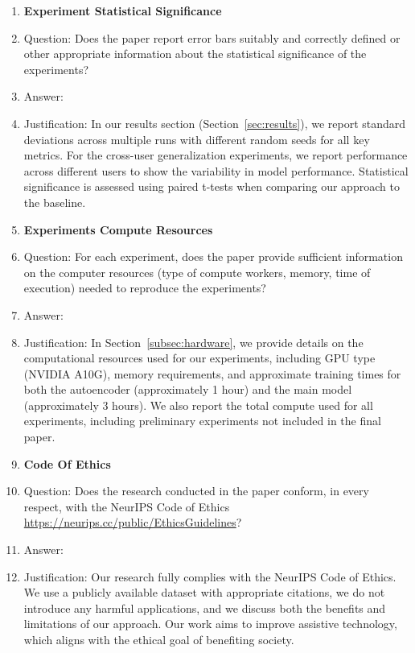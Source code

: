 \begin{enumerate}
    \item {\bf Experiment Statistical Significance}
    \item[] Question: Does the paper report error bars suitably and correctly defined or other appropriate information about the statistical significance of the experiments?
    \item[] Answer: \answerYes{}
    \item[] Justification: In our results section (Section~\ref{sec:results}), we report standard deviations across multiple runs with different random seeds for all key metrics. For the cross-user generalization experiments, we report performance across different users to show the variability in model performance. Statistical significance is assessed using paired t-tests when comparing our approach to the baseline.

    \item {\bf Experiments Compute Resources}
    \item[] Question: For each experiment, does the paper provide sufficient information on the computer resources (type of compute workers, memory, time of execution) needed to reproduce the experiments?
    \item[] Answer: \answerYes{}
    \item[] Justification: In Section~\ref{subsec:hardware}, we provide details on the computational resources used for our experiments, including GPU type (NVIDIA A10G), memory requirements, and approximate training times for both the autoencoder (approximately 1 hour) and the main model (approximately 3 hours). We also report the total compute used for all experiments, including preliminary experiments not included in the final paper.

    \item {\bf Code Of Ethics}
    \item[] Question: Does the research conducted in the paper conform, in every respect, with the NeurIPS Code of Ethics \url{https://neurips.cc/public/EthicsGuidelines}?
    \item[] Answer: \answerYes{}
    \item[] Justification: Our research fully complies with the NeurIPS Code of Ethics. We use a publicly available dataset with appropriate citations, we do not introduce any harmful applications, and we discuss both the benefits and limitations of our approach. Our work aims to improve assistive technology, which aligns with the ethical goal of benefiting society.


\end{enumerate}
